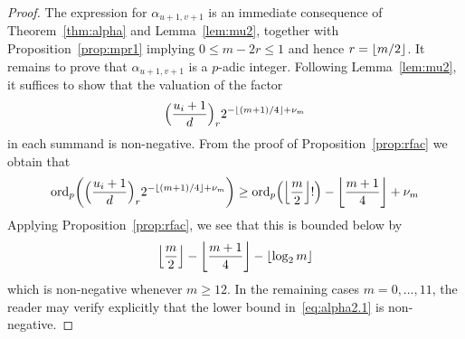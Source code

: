 \begin{proof}
The expression for $\alpha_{u+1,v+1}$ is an immediate consequence 
of Theorem~\ref{thm:alpha} and Lemma~\ref{lem:mu2}, together with 
Proposition~\ref{prop:mpr1} implying $0 \leq m - 2r \leq 1$ and 
hence $r = \left\lfloor m/2\right\rfloor$.  It remains to prove that 
$\alpha_{u+1,v+1}$ is a $p$-adic integer.  Following Lemma~\ref{lem:mu2}, 
it suffices to show that the valuation of the factor 
\begin{equation*}
\Bigl(\frac{u_i+1}{d}\Bigr)_r 2^{- \left\lfloor(m+1)/4\right\rfloor + \nu_m}
\end{equation*}
in each summand is non-negative.  From the proof of 
Proposition~\ref{prop:rfac} we obtain that 
\begin{equation} \label{eq:alpha2.1}
\operatorname{ord}_p \biggl( \Bigl(\frac{u_i+1}{d}\Bigr)_r 2^{- \left\lfloor(m+1)/4\right\rfloor + \nu_m} \biggr)
\geq \operatorname{ord}_p\Bigl(\left\lfloor\frac{m}{2}\right\rfloor!\Bigr) - \left\lfloor\frac{m+1}{4}\right\rfloor + \nu_m
\end{equation}
Applying Proposition~\ref{prop:rfac}, we see that this is bounded 
below by 
\begin{equation*}
\left\lfloor\frac{m}{2}\right\rfloor - \left\lfloor\frac{m+1}{4}\right\rfloor - \left\lfloor\log_2 m\right\rfloor
\end{equation*}
which is non-negative whenever $m \geq 12$.  In the remaining 
cases $m = 0, \dotsc, 11$, the reader may verify explicitly 
that the lower bound in~\eqref{eq:alpha2.1} is non-negative.
\end{proof}

